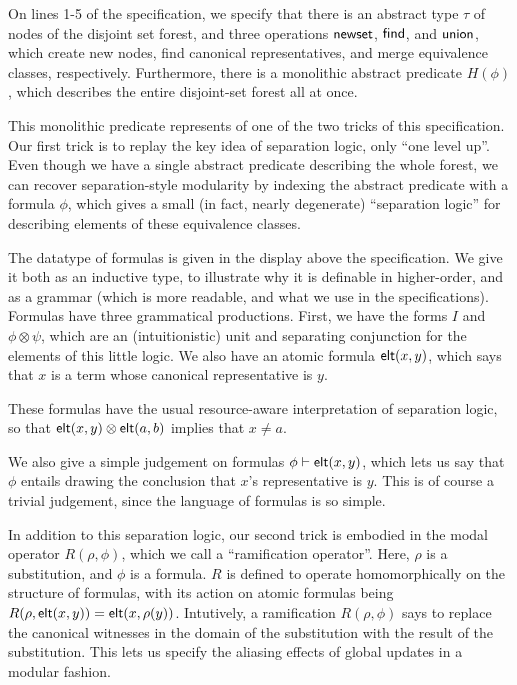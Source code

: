 On lines 1-5 of the specification, we specify that there is an
abstract type $\tau$ of nodes of the disjoint set forest, and three
operations $\mathsf{newset}$, $\mathsf{find}$, and $\mathsf{union}$, which create new nodes,
find canonical representatives, and merge equivalence classes,
respectively. Furthermore, there is a monolithic abstract predicate
$H(\phi)$, which describes the entire disjoint-set forest all at once.

This monolithic predicate represents of one of the two tricks of this
specification. Our first trick is to replay the key idea of separation
logic, only ``one level up''. Even though we have a single abstract
predicate describing the whole forest, we can recover separation-style
modularity by indexing the abstract predicate with a formula $\phi$,
which gives a small (in fact, nearly degenerate) ``separation logic''
for describing elements of these equivalence classes.  

The datatype of formulas is given in the display above the
specification. We give it both as an inductive type, to illustrate why
it is definable in higher-order, and as a grammar (which is more
readable, and what we use in the specifications). Formulas have three
grammatical productions. First, we have the forms $I$ and $\phi
\otimes \psi$, which are an (intuitionistic) unit and separating
conjunction for the elements of this little logic. We also have an
atomic formula $\mathsf{elt}({x}, {y})$, which says that $x$ is a term whose
canonical representative is $y$. 

These formulas have the usual resource-aware interpretation of
separation logic, so that $\mathsf{elt}({x}, {y}) \otimes \mathsf{elt}({a}, {b})$ implies that
$x \not= a$. %

We also give a simple judgement on formulas ${\phi} \vdash \mathsf{elt}({x}, {y})$,
which lets us say that $\phi$ entails drawing the conclusion that
$x$'s representative is $y$. This is of course a trivial judgement,
since the language of formulas is so simple.

In addition to this separation logic, our second trick is embodied in
the modal operator $R(\rho, \phi)$, which we call a ``ramification
operator''. Here, $\rho$ is a substitution, and $\phi$ is a
formula. $R$ is defined to operate homomorphically on the structure of
formulas, with its action on atomic formulas being $R(\rho,
\mathsf{elt}({x}, {y})) = \mathsf{elt}({x}, {\rho(y)})$. Intutively, a ramification $R(\rho,
\phi)$ says to replace the canonical witnesses in the domain of the
substitution with the result of the substitution. This lets us specify
the aliasing effects of global updates in a modular fashion.


